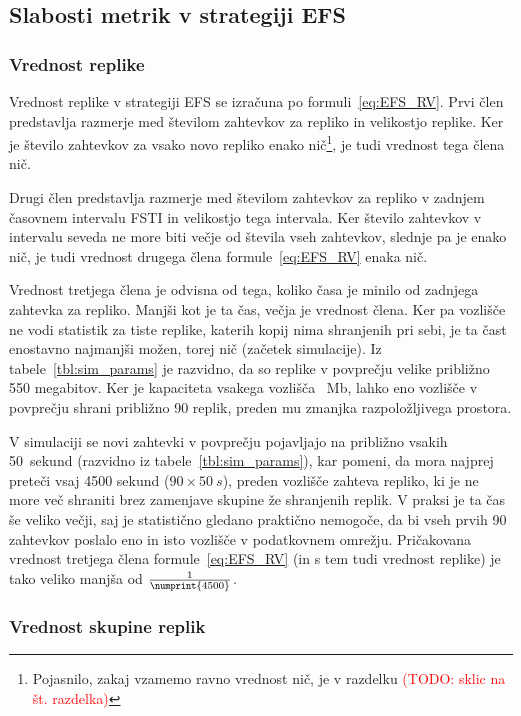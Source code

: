 \documentclass[a4paper, 12pt]{book}
\newcommand{\TODO}[1]{\textcolor{red}{(TODO: #1)}}
\begin{document}
\subsection{Slabosti metrik v strategiji EFS}

\subsubsection{Vrednost replike}

Vrednost replike v strategiji EFS se izračuna po formuli~\eqref{eq:EFS_RV}.
Prvi člen predstavlja razmerje med številom zahtevkov za repliko in velikostjo
replike. Ker je število zahtevkov za vsako novo repliko enako nič\footnote{%
Pojasnilo, zakaj vzamemo ravno vrednost nič, je v razdelku \TODO{sklic na
št. razdelka}}, je tudi vrednost tega člena nič.

Drugi člen predstavlja razmerje med številom zahtevkov za repliko v zadnjem
časovnem intervalu FSTI in velikostjo tega intervala. Ker število zahtevkov
v intervalu seveda ne more biti večje od števila vseh zahtevkov,
slednje pa je enako nič, je tudi vrednost drugega člena
formule~\eqref{eq:EFS_RV} enaka nič.

Vrednost tretjega člena je odvisna od tega, koliko časa je minilo
od zadnjega zahtevka za repliko. Manjši kot je ta čas, večja je vrednost člena.
Ker pa vozlišče ne vodi statistik za tiste replike, katerih kopij nima
shranjenih pri sebi, je ta čast enostavno najmanjši možen, torej nič (začetek
simulacije). Iz tabele~\ref{tbl:sim_params} je razvidno, da so replike v
povprečju velike približno 550 megabitov. Ker je kapaciteta vsakega vozlišča
~Mb, lahko eno vozlišče v povprečju shrani približno 90
replik, preden mu zmanjka razpoložljivega prostora.

V simulaciji se novi zahtevki v povprečju pojavljajo na približno vsakih
50~sekund (razvidno iz tabele~\ref{tbl:sim_params}), kar pomeni, da mora
najprej preteči vsaj 4500 sekund ($90 \times 50\:s$), preden vozlišče
zahteva repliko, ki je ne more več shraniti brez zamenjave skupine
že shranjenih replik. V praksi je ta čas še veliko večji, saj je statistično
gledano praktično nemogoče, da bi vseh prvih 90 zahtevkov poslalo eno in isto
vozlišče v podatkovnem omrežju. Pričakovana vrednost tretjega člena
formule~\eqref{eq:EFS_RV} (in s tem tudi vrednost replike) je tako veliko
manjša od $\frac{1}{\numprint{4500}}$.

\subsubsection{Vrednost skupine replik}
\end{document}
